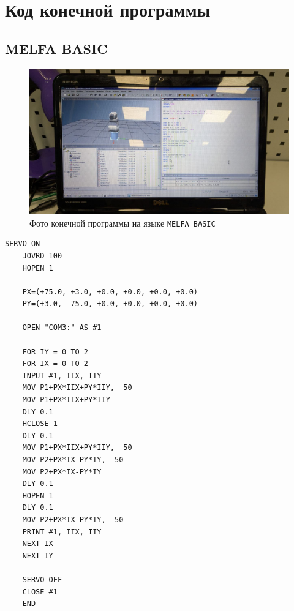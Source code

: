 \documentclass[a4paper, 12pt]{article}
\begin{document}
    \section{Код конечной программы}
    \subsection{MELFA BASIC}
    \begin{figure}[H]
        \centering
        \includegraphics[scale=0.36]{code.jpg}
        \captionsetup{skip=0pt}
        \caption{Фото конечной программы на языке \texttt{MELFA BASIC}}
        \label{fig:codephoto}
    \end{figure}
    \begin{lstlisting}[label=code, caption={Листинг конечной программы на языке \texttt{MELFA BASIC}}]
    SERVO ON
    JOVRD 100
    HOPEN 1

    PX=(+75.0, +3.0, +0.0, +0.0, +0.0, +0.0)
    PY=(+3.0, -75.0, +0.0, +0.0, +0.0, +0.0)

    OPEN "COM3:" AS #1

    FOR IY = 0 TO 2
    FOR IX = 0 TO 2
    INPUT #1, IIX, IIY
    MOV P1+PX*IIX+PY*IIY, -50
    MOV P1+PX*IIX+PY*IIY
    DLY 0.1
    HCLOSE 1
    DLY 0.1
    MOV P1+PX*IIX+PY*IIY, -50
    MOV P2+PX*IX-PY*IY, -50
    MOV P2+PX*IX-PY*IY
    DLY 0.1
    HOPEN 1
    DLY 0.1
    MOV P2+PX*IX-PY*IY, -50
    PRINT #1, IIX, IIY
    NEXT IX
    NEXT IY

    SERVO OFF
    CLOSE #1
    END
    \end{lstlisting}
\end{document}
